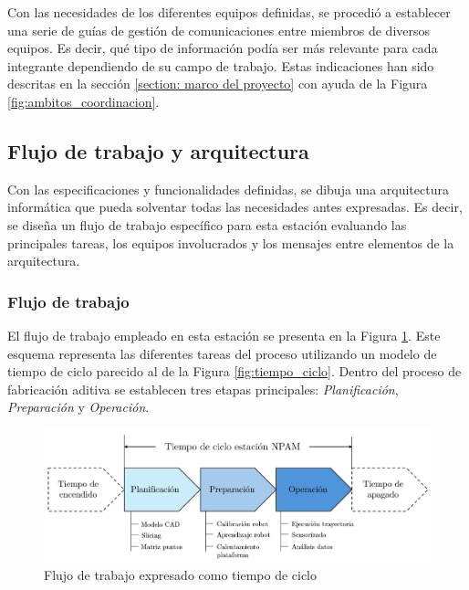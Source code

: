 Con las necesidades de los diferentes equipos definidas, se procedió a establecer una serie de guías de gestión de comunicaciones entre miembros de diversos equipos. Es decir, qué tipo de información podía ser más relevante para cada integrante dependiendo de su campo de trabajo. Estas indicaciones han sido descritas en la sección \ref{section:  marco del proyecto} con ayuda de la Figura \ref{fig:ambitos_coordinacion}.

\subsection{Flujo de trabajo y arquitectura}

Con las especificaciones y funcionalidades definidas, se dibuja una arquitectura informática que pueda solventar todas las necesidades antes expresadas. Es decir, se diseña un flujo de trabajo específico para esta estación evaluando las principales tareas, los equipos involucrados y los mensajes entre elementos de la arquitectura.

\subsubsection*{Flujo de trabajo}
\hypertarget{Flujo de trabajo arquitectura}{}

El flujo de trabajo empleado en esta estación se presenta en la Figura \ref{fig:tiempo_ciclo_estacion}. Este esquema representa las diferentes tareas del proceso utilizando un modelo de tiempo de ciclo parecido al de la Figura \ref{fig:tiempo_ciclo}. Dentro del proceso de fabricación aditiva se establecen tres etapas principales: \textit{Planificación}, \textit{Preparación} y \textit{Operación}.

\begin{figure}[h!]
    \centering
    \includegraphics[scale=0.45]{figuras/tiempo_ciclo_estacion_v2.jpg}
    \caption{Flujo de trabajo expresado como tiempo de ciclo}
    \label{fig:tiempo_ciclo_estacion}
\end{figure}

